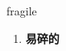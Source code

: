 
\begin{frame}
{\huge fragile}
\begin{center}
\begin{enumerate}\Large
  \item \textbf{易碎的}
\end{enumerate}
\end{center}
\end{frame}
